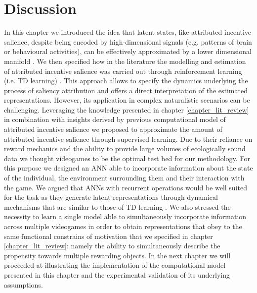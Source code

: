 \section{Discussion}
In this chapter we introduced the idea that latent states, like attributed incentive salience, despite being encoded by high-dimensional signals (e.g. patterns of brain or behavioural activities), can be effectively approximated by a lower dimensional manifold \cite{gallego2017neural, derdikman2011manifold, nieh2021geometry, bromberg2010coding, seung2000manifold, ganmor2015thesaurus, stopfer2003intensity}. We then specified how in the literature the modelling and estimation of attributed incentive salience was carried out through reinforcement learning (i.e. TD learning) \cite{mcclure2003computational,zhang2009neural}. This approach allows to specify the dynamics underlying the process of saliency attribution and offers a direct interpretation of the estimated representations. However, its application in complex naturalistic scenarios can be challenging. Leveraging the knowledge presented in chapter \ref{chapter_lit_review} in combination with insights derived by previous computational model of attributed incentive salience \cite{mcclure2003computational,zhang2009neural} we proposed to approximate the amount of attributed incentive salience through supervised learning. Due to their reliance on reward mechanics and the ability to provide large volumes of ecologically sound data we thought videogames to be the optimal test bed for our methodology. For this purpose we designed an ANN able to incorporate information about the state of the individual, the environment surrounding them and their interaction with the game. We argued that ANNs with recurrent operations would be well suited for the task as they generate latent representations through dynamical mechanisms that are similar to those of TD learning \cite{barto2004reinforcement}. We also stressed the necessity to learn a single model able to simultaneously incorporate information across multiple videogames in order to obtain representations that obey to the same functional constrains of motivation that we specified in chapter \ref{chapter_lit_review}: namely the ability to simultaneously describe the propensity towards multiple rewarding objects. In the next chapter we will proceeded at illustrating the implementation of the computational model presented in this chapter and the experimental validation of its underlying assumptions.